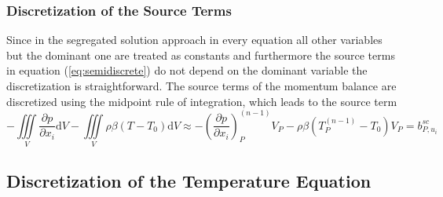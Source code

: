      \subsubsection{Discretization of the Source Terms}

      Since in the segregated solution approach in every equation all other variables but the dominant one are treated as constants and furthermore the source terms in equation (\ref{eq:semidiscrete}) do not depend on the dominant variable the discretization is straightforward. The source terms of the momentum balance are discretized using the midpoint rule of integration, which leads to the source term
      \begin{equation}
        - \iiint\limits_V \frac{\partial p}{\partial x_i} \mathrm{d}V
        - \iiint\limits_V \rho \beta \left(T - T_0\right) \mathrm{d}V
        \approx
        - \left(\frac{\partial p}{\partial x_i}\right)_P^{(n-1)} V_P
        - \rho \beta \left(T_P^{(n-1)} - T_0\right) V_P
        = b_{P,u_i}^{sc}
      \end{equation}

  \subsection{Discretization of the Temperature Equation}
  \label{sec:discretetemperature}

